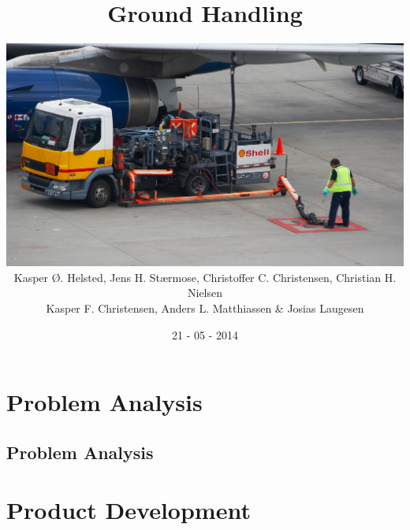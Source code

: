 \documentclass[12pt,a4paper]{report}
\title{Ground Handling}
\author{
    \includegraphics[width=14cm]{Grafik/index.jpg} \\
        Kasper Ø. Helsted, Jens H. Stærmose, Christoffer C. Christensen, Christian H. Nielsen\\
        Kasper F. Christensen, Anders L. Matthiassen \& Josias Laugesen\\
}
\date{21 - 05 - 2014}
\begin{document}
    \maketitle
    \afterpage{\null\newpage}
    \clearpage  
    
    \afterpage{\null\newpage}
    \clearpage  
    
    \tableofcontents
    \thispagestyle{empty}
    \clearpage
    \setcounter{page}{1}
    
    \part{Problem Analysis}
    \chapter{Problem Analysis}
		
    
    
    
    
		
		
    
    
		

    \part{Product Development}
    
    \printbibliography
\end{document}
